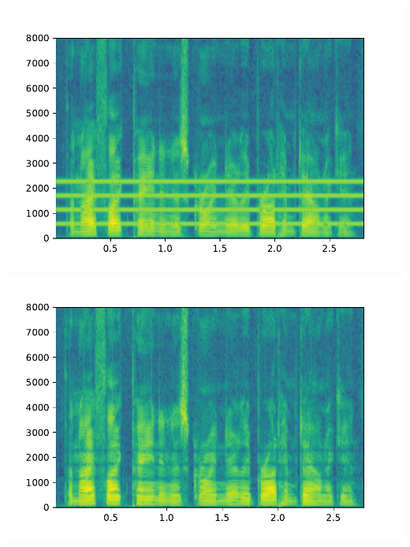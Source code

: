 \documentclass[12pt,a4paper]{article}
\begin{document}
		

	
		\includegraphics{img/before.pdf}
		\includegraphics{img/after.pdf}
		\newpage
		
	
	
\end{document}
